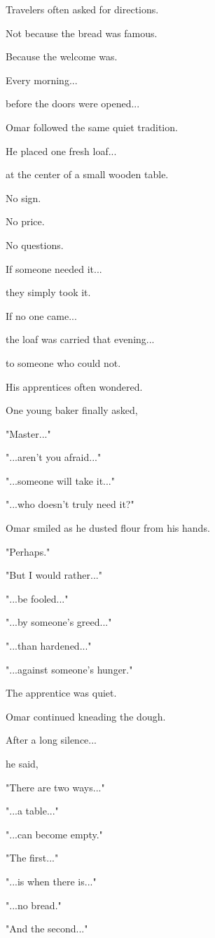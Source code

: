 \documentclass[12pt,openany]{book}
\begin{document}
Travelers often asked for directions.

Not because the bread was famous.

Because the welcome was.

Every morning...

before the doors were opened...

Omar followed the same quiet tradition.

He placed one fresh loaf...

at the center of a small wooden table.

No sign.

No price.

No questions.

If someone needed it...

they simply took it.

If no one came...

the loaf was carried that evening...

to someone who could not.

His apprentices often wondered.

One young baker finally asked,

"Master..."

"...aren't you afraid..."

"...someone will take it..."

"...who doesn't truly need it?"

Omar smiled as he dusted flour from his hands.

"Perhaps."

"But I would rather..."

"...be fooled..."

"...by someone's greed..."

"...than hardened..."

"...against someone's hunger."

The apprentice was quiet.

Omar continued kneading the dough.

After a long silence...

he said,

"There are two ways..."

"...a table..."

"...can become empty."

"The first..."

"...is when there is..."

"...no bread."

"And the second..."
\end{document}
